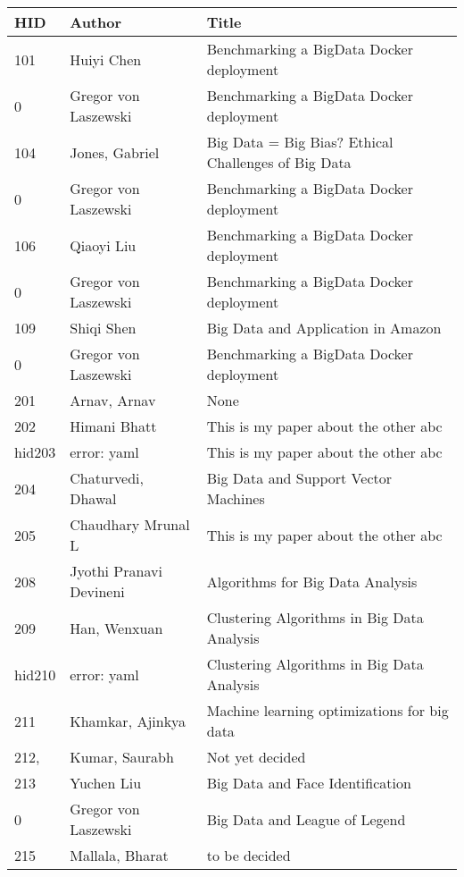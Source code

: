 \documentclass[12pt]{book}
\begin{document}
\begin{footnotesize}
\begin{longtable}{|p{1cm}p{5cm}p{9cm}|}
\hline \textbf{HID} & \textbf{Author} & \textbf{Title} \\ \hline \hline

101 & Huiyi Chen & Benchmarking a BigData Docker deployment  \\
\hline
0 & Gregor von Laszewski & Benchmarking a BigData Docker deployment  \\
\hline
104 & Jones, Gabriel & Big Data = Big Bias? Ethical Challenges of Big Data  \\
\hline
0 & Gregor von Laszewski & Benchmarking a BigData Docker deployment  \\
\hline
106 & Qiaoyi Liu & Benchmarking a BigData Docker deployment  \\
\hline
0 & Gregor von Laszewski & Benchmarking a BigData Docker deployment  \\
\hline
109 & Shiqi Shen & Big Data and Application in Amazon  \\
\hline
0 & Gregor von Laszewski & Benchmarking a BigData Docker deployment  \\
\hline
201 & Arnav, Arnav & None  \\
\hline
202 & Himani Bhatt & This is my paper about the other abc  \\
\hline
hid203 & error: yaml & This is my paper about the other abc  \\
\hline
204 & Chaturvedi, Dhawal & Big Data and Support Vector Machines  \\
\hline
205 & Chaudhary Mrunal L & This is my paper about the other abc  \\
\hline
208 & Jyothi Pranavi Devineni & Algorithms for Big Data Analysis  \\
\hline
209 & Han, Wenxuan & Clustering Algorithms in Big Data Analysis  \\
\hline
hid210 & error: yaml & Clustering Algorithms in Big Data Analysis  \\
\hline
211 & Khamkar, Ajinkya & Machine learning optimizations for big data  \\
\hline
212, & Kumar, Saurabh & Not yet decided  \\
\hline
213 & Yuchen Liu & Big Data and Face Identification  \\
\hline
0 & Gregor von Laszewski & Big Data and League of Legend  \\
\hline
215 & Mallala, Bharat & to be decided  \\

\end{longtable}
\end{footnotesize}
\end{document}
